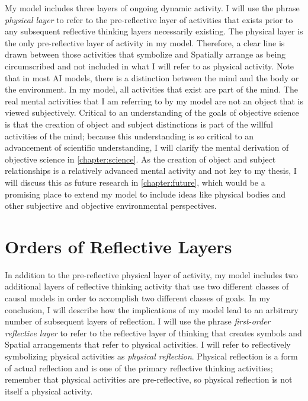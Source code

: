My model includes three layers of ongoing dynamic activity.  I will
use the phrase \emph{physical layer} to refer to the pre-reflective
layer of activities that exists prior to any subsequent reflective
thinking layers necessarily existing.  The physical layer is the only
pre-reflective layer of activity in my model.  Therefore, a clear line
is drawn between those activities that symbolize and Spatially arrange
as being circumscribed and not included in what I will refer to as
physical activity.  Note that in most AI models, there is a
distinction between the mind and the body or the environment.  In my
model, all activities that exist are part of the mind.  The real
mental activities that I am referring to by my model are not an object
that is viewed subjectively.  Critical to an understanding of the
goals of objective science is that the creation of object and subject
distinctions is part of the willful activities of the mind; because
this understanding is so critical to an advancement of scientific
understanding, I will clarify the mental derivation of objective
science in \autoref{chapter:science}.  As the creation of object and
subject relationships is a relatively advanced mental activity and not
key to my thesis, I will discuss this as future research in
\autoref{chapter:future}, which would be a promising place to extend
my model to include ideas like physical bodies and other subjective
and objective environmental perspectives.

\section{Orders of Reflective Layers}

In addition to the pre-reflective physical layer of activity, my model
includes two additional layers of reflective thinking activity that
use two different classes of causal models in order to accomplish two
different classes of goals.  In my conclusion, I will describe how the
implications of my model lead to an arbitrary number of subsequent
layers of reflection.  I will use the phrase \emph{first-order
  reflective layer} to refer to the reflective layer of thinking that
creates symbols and Spatial arrangements that refer to physical
activities.  I will refer to reflectively symbolizing physical
activities as \emph{physical reflection}.  Physical reflection is a
form of actual reflection and is one of the primary reflective
thinking activities; remember that physical activities are
pre-reflective, so physical reflection is not itself a physical
activity.


